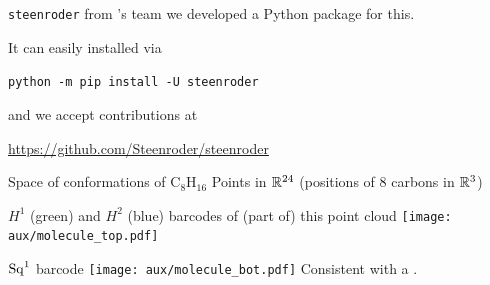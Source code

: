 \begin{frame}{\texttt{steenroder}}
	from 's team we developed a Python package for this.

	\pause\smallskip
	It can easily installed via
	\begin{center}
		\texttt{python -m pip install -U steenroder}
	\end{center}

	and we accept contributions at
	\begin{center}
		\url{https://github.com/Steenroder/steenroder}
	\end{center}
\end{frame}

\begin{frame}{Space of conformations of $\mathrm{C_8H_{16}}$}
	\pause
	Points in $\mathbb{R}^{24}$ (positions of $8$ carbons in $\mathbb{R}^3$)

	\pause\medskip
	$H^1$ (green) and $H^2$ (blue) barcodes of (part of) this point cloud
	\texttt{[image: aux/molecule\_top.pdf]}

	\pause
	$\operatorname{Sq}^1$ barcode
	\texttt{[image: aux/molecule\_bot.pdf]}
	Consistent with a .
\end{frame}

%

%
